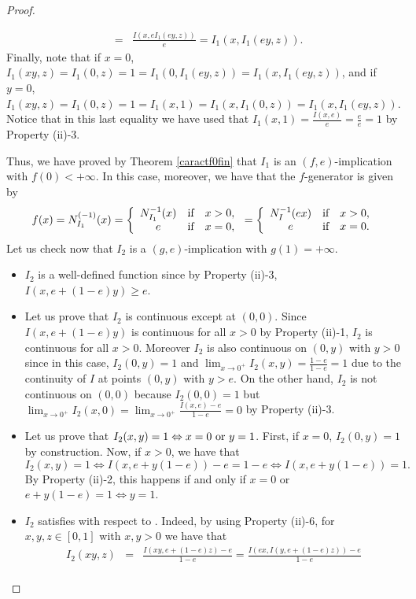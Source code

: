 \begin{proof}
\begin{itemize}
\begin{eqnarray*}
		&=&\frac{I(x,eI_1(ey,z))}{e} =I_1(x,I_1(ey,z)).
		\end{eqnarray*}
		Finally, note that if $x=0$, $I_1(xy,z)=I_1(0,z)=1=I_1(0,I_1(ey,z))=I_1(x,I_1(ey,z))$, and if $y=0$, $I_1(xy,z)=I_1(0,z)=1=I_1(x,1)=I_1(x,I_1(0,z))=I_1(x,I_1(ey,z))$. Notice that in this last equality we have used that $I_1(x,1)=\frac{I(x,e)}{e}=\frac{e}{e}=1$ by Property (ii)-3.
	\end{itemize}
	Thus, we have proved by Theorem \ref{caractf0fin} that $I_1$ is an $(f,e)$-implication with $f(0) < +\infty$. In this case, moreover, we have that the $f$-generator is given by
	$$f(x)=N_{I_1}^{(-1)}(x)= \left\{ \begin{array}{ccl}
		N_{I_1}^{-1}(x) &   \hbox{if}  & x>0, \\
		e &  \hbox{if} & x=0,
	\end{array}
	\right. =
	\left\{ \begin{array}{ccl}
		N_{I}^{-1}(ex) &   \hbox{if}  & x>0, \\
		e &  \hbox{if} & x=0.
	\end{array}
	\right.
	$$
	Let us check now that $I_2$ is a $(g,e)$-implication with $g(1)=+\infty$.
	\begin{itemize}
		\item $I_2$ is a well-defined function since by Property (ii)-3, $I(x,e+(1-e)y)\geq e$.
		\item Let us prove that $I_2$ is continuous except at $(0,0)$. Since $I(x,e+(1-e)y)$ is continuous for all $x>0$ by Property (ii)-1, $I_2$ is continuous for all $x>0$. Moreover $I_2$ is also continuous on $(0,y)$ with $y>0$ since in this case, $I_2(0,y)=1$ and $\displaystyle \lim_{x \to 0^+}I_2(x,y)=\frac{1-e}{1-e}=1$ due to the continuity of $I$ at points $(0,y)$ with $y>e$. On the other hand, $I_2$ is not continuous on $(0,0)$ because $I_2(0,0)=1$ but $\displaystyle \lim_{x \to 0^+} I_2(x,0)=\lim_{x \to 0^+}\frac{I(x,e)-e}{1-e}=0$ by Property (ii)-3.
		\item Let us prove that $I_2(x,y)=1 \Leftrightarrow x=0 \hbox{ or } y=1$. First, if $x=0$, $I_2(0,y)=1$ by construction. Now, if $x>0$, we have that
		$$I_2(x,y)=1 \Leftrightarrow I(x,e+y(1-e))-e=1-e \Leftrightarrow I(x,e+y(1-e))=1.$$
		By Property (ii)-2, this happens if and only if $x=0$ or $e+y(1-e)=1 \Leftrightarrow y=1$.
		\item $I_2$ satisfies \LIex with respect to \TP. Indeed, by using Property (ii)-6, for $x,y,z \in [0,1]$ with $x,y>0$ we have that
		\begin{eqnarray*}
			I_2(xy,z) &=&  \frac{I(xy,e+(1-e)z)-e}{1-e} =  \frac{I(ex,I(y,e+(1-e)z))-e}{1-e} \\

\end{eqnarray*}
\end{itemize}
\end{proof}
